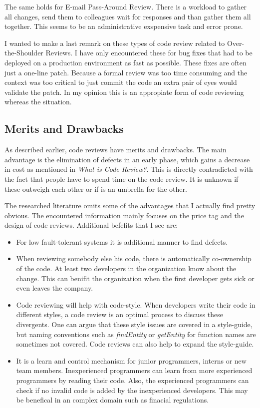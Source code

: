 The same holds for E-mail Pass-Around Review. There is a workload to gather all changes, send them to colleagues wait for responses and than gather them all together.
This seems to be an administrative exspensive task and error prone.

I wanted to make a last remark on these types of code review related to Over-the-Shoulder Reviews.
I have only encountered these for bug fixes that had to be deployed on a production environment as fast as possible.
These fixes are often just a one-line patch.
Because a formal review was too time consuming and the context was too critical to just commit the code an extra pair of eyes would validate the patch.
In my opinion this is an appropiate form of code reviewing whereas the situation.

\subsection*{Merits and Drawbacks}

As described earlier, code reviews have merits and drawbacks.
The main advantage is the elimination of defects in an early phase, which gains a decrease in cost as mentioned in \textit{What is Code Review?}.
This is directly contradicted with the fact that people have to spend time on the code review.
It is unknown if these outweigh each other or if is an umbrella for the other.

The researched literature omits some of the advantages that I actually find pretty obvious.
The encountered information mainly focuses on the price tag and the design of code reviews.
Additional befefits that I see are:

\begin{itemize}
\setlength\itemsep{0em}
\item
For low fault-tolerant systems it is additional manner to find defects.
\item
When reviewing somebody else his code, there is automatically co-ownership of the code.
At least two developers in the organization know about the change.
This can benifit the organization when the first developer gets sick or even leaves the company.
\item
Code reviewing will help with code-style. When developers write their code in different styles, a code review is an optimal process to discuss these divergents.
One can argue that these style issues are covered in a style-guide, but naming conventions such as \textit{findEntity} or \textit{getEntity} for function names are sometimes not covered.
Code reviews can also help to expand the style-guide.
\item
It is a learn and control mechanism for junior programmers, interns or new team members.
Inexperienced programmers can learn from more experienced programmers by reading their code.
Also, the experienced programmers can check if no invalid code is added by the inexperienced developers.
This may be benefical in an complex domain such as finacial regulations.
\end{itemize}


